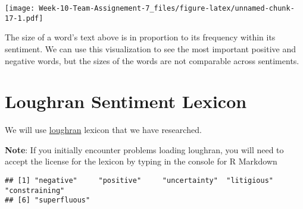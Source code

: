 \documentclass[
]{article}
\newenvironment{Shaded}{\begin{snugshade}}{\end{snugshade}}
\newcommand{\FunctionTok}[1]{\textcolor[rgb]{0.00,0.00,0.00}{#1}}
\newcommand{\NormalTok}[1]{#1}
\newcommand{\OtherTok}[1]{\textcolor[rgb]{0.56,0.35,0.01}{#1}}
\newcommand{\SpecialCharTok}[1]{\textcolor[rgb]{0.00,0.00,0.00}{#1}}
\newcommand{\StringTok}[1]{\textcolor[rgb]{0.31,0.60,0.02}{#1}}
\begin{document}
\texttt{[image: Week-10-Team-Assignement-7\_files/figure-latex/unnamed-chunk-17-1.pdf]}

The size of a word's text above is in proportion to its frequency within
its sentiment. We can use this visualization to see the most important
positive and negative words, but the sizes of the words are not
comparable across sentiments.

\hypertarget{loughran-sentiment-lexicon}{%
\section{Loughran Sentiment Lexicon}\label{loughran-sentiment-lexicon}}

We will use
\href{https://rdrr.io/cran/tidytext/man/get_sentiments.html}{loughran}
lexicon that we have researched.

\textbf{Note}: If you initially encounter problems loading loughran, you
will need to accept the license for the lexicon by typing in the console
for R Markdown

\begin{Shaded}
\end{Shaded}

\begin{verbatim}
## [1] "negative"     "positive"     "uncertainty"  "litigious"    "constraining"
## [6] "superfluous"
\end{verbatim}
\end{document}
